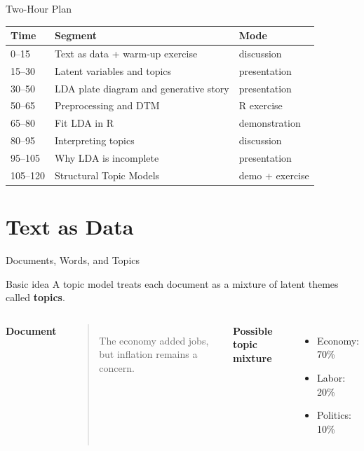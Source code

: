 \documentclass[aspectratio=169]{beamer}
\begin{document}
\begin{frame}{Two-Hour Plan}
\begin{center}
\begin{tabular}{lll}
\toprule
Time & Segment & Mode \\
\midrule
0--15 & Text as data + warm-up exercise & discussion \\
15--30 & Latent variables and topics & presentation \\
30--50 & LDA plate diagram and generative story & presentation \\
50--65 & Preprocessing and DTM & R exercise \\
65--80 & Fit LDA in R & demonstration \\
80--95 & Interpreting topics & discussion \\
95--105 & Why LDA is incomplete & presentation \\
105--120 & Structural Topic Models & demo + exercise \\
\bottomrule
\end{tabular}
\end{center}
\end{frame}

\section{Text as Data}

\begin{frame}{Documents, Words, and Topics}
\begin{block}{Basic idea}
A topic model treats each document as a mixture of latent themes called \textbf{topics}.
\end{block}

\vspace{0.3cm}
\begin{columns}
\textbf{Document}
\begin{quote}
The economy added jobs, but inflation remains a concern.
\end{quote}

\textbf{Possible topic mixture}
\begin{itemize}
  \item Economy: 70\%
  \item Labor: 20\%
  \item Politics: 10\%
\end{itemize}
\end{columns}
\end{frame}
\end{document}
